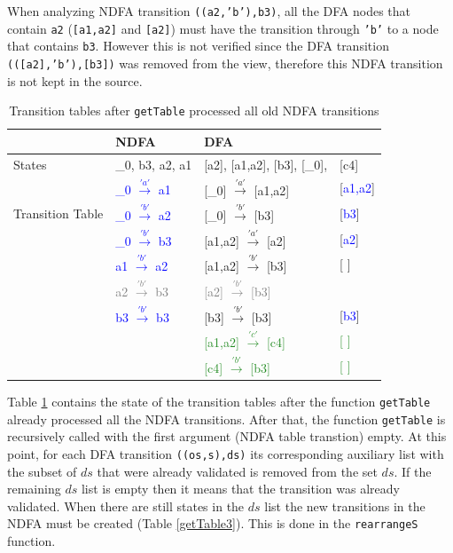 When analyzing NDFA transition \texttt{((a2,'b'),b3)}, all the DFA nodes that contain \texttt{a2} (\texttt{[a1,a2]} and \texttt{[a2]}) must have the transition through \texttt{'b'} to a node that contains \texttt{b3}. However this is not verified since the DFA transition \texttt{(([a2],'b'),[b3])} was removed from the view, therefore this NDFA transition is not kept in the source.


\begin{table}[H]
  \begin{center}
    \begin{tabular}{ | p{3cm} |p{4cm}||p{3cm} p{1cm} |  }
    \hline
         & NDFA & DFA & \\ [1ex]
        \hline
        States & \_0, b3, a2, a1 & [a2], [a1,a2], [b3], [\_0], & [c4]\\ [0.7ex]
        \hline
        \multirow{3}{5em}{Transition Table} & \textcolor{blue}{\_0 $\xrightarrow{'a'}$ a1} & [\_0] $\xrightarrow{'a'}$ [a1,a2] & [\textcolor{blue}{a1,a2}]\\
        & \textcolor{blue}{\_0 $\xrightarrow{'b'}$ a2} & [\_0]   $\xrightarrow{'b'}$ [b3] & [\textcolor{blue}{b3}]\\
        & \textcolor{blue}{\_0 $\xrightarrow{'b'}$ b3} & [a1,a2]  $\xrightarrow{'a'}$ [a2] & [\textcolor{blue}{a2}]\\
        & \textcolor{blue}{a1  $\xrightarrow{'b'}$ a2} & [a1,a2]  $\xrightarrow{'b'}$ [b3] & [ ]\\
        & \textcolor{gray}{a2  $\xrightarrow{'b'}$ b3} & \textcolor{gray}{[a2]     $\xrightarrow{'b'}$ [b3]} &  \\
        & \textcolor{blue}{b3  $\xrightarrow{'b'}$ b3} & [b3]     $\xrightarrow{'b'}$ [b3] & [\textcolor{blue}{b3}]\\
        &  & \textcolor{ForestGreen}{[a1,a2]  $\xrightarrow{'c'}$ [c4]} & \textcolor{ForestGreen}{[ ]}\\
        &  & \textcolor{ForestGreen}{[c4]  $\xrightarrow{'b'}$ [b3]} & \textcolor{ForestGreen}{[ ]}\\
        \hline
        \end{tabular}
  \end{center}
  \caption{Transition tables after \texttt{getTable} processed all old NDFA transitions}
  \label{getTable2}
\end{table}

Table \ref{getTable2} contains the state of the transition tables after the function \texttt{getTable} already processed all the NDFA transitions. After that, the function \texttt{getTable} is recursively called with the first argument (NDFA table transtion) empty. At this point, for each DFA transition \texttt{((os,s),ds)} its corresponding auxiliary list with the subset of $ds$ that were already validated is removed from the set $ds$. If the remaining $ds$ list is empty then it means that the transition was already validated. When there are still states in the $ds$ list the new transitions in the NDFA must be created (Table \ref{getTable3}). This is done in the \texttt{rearrangeS} function. 

